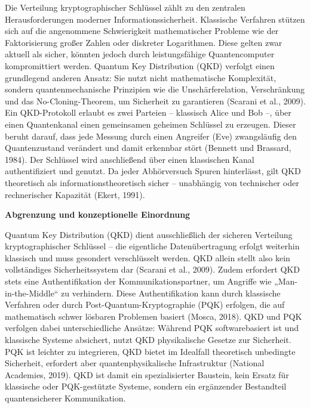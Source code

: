 \noindent
Die Verteilung kryptographischer Schlüssel zählt zu den zentralen Herausforderungen moderner Informationssicherheit. Klassische Verfahren stützen sich auf die angenommene Schwierigkeit mathematischer Probleme wie der Faktorisierung großer Zahlen oder diskreter Logarithmen. Diese gelten zwar aktuell als sicher, könnten jedoch durch leistungsfähige Quantencomputer kompromittiert werden.
Quantum Key Distribution (QKD) verfolgt einen grundlegend anderen Ansatz: Sie nutzt nicht mathematische Komplexität, sondern quantenmechanische Prinzipien wie die Unschärferelation, Verschränkung und das No-Cloning-Theorem, um Sicherheit zu garantieren (Scarani et al., 2009).
Ein QKD-Protokoll erlaubt es zwei Parteien – klassisch Alice und Bob –, über einen Quantenkanal einen gemeinsamen geheimen Schlüssel zu erzeugen. Dieser beruht darauf, dass jede Messung durch einen Angreifer (Eve) zwangsläufig den Quantenzustand verändert und damit erkennbar stört (Bennett und Brassard, 1984).
Der Schlüssel wird anschließend über einen klassischen Kanal authentifiziert und genutzt. Da jeder Abhörversuch Spuren hinterlässt, gilt QKD theoretisch als informationstheoretisch sicher – unabhängig von technischer oder rechnerischer Kapazität (Ekert, 1991).


\vspace{1em}
\noindent\textbf{Abgrenzung und konzeptionelle Einordnung}

\noindent
Quantum Key Distribution (QKD) dient ausschließlich der sicheren Verteilung kryptographischer Schlüssel – die eigentliche Datenübertragung erfolgt weiterhin klassisch und muss gesondert verschlüsselt werden. QKD allein stellt also kein vollständiges Sicherheitssystem dar (Scarani et al., 2009).
Zudem erfordert QKD stets eine Authentifikation der Kommunikationspartner, um Angriffe wie „Man-in-the-Middle“ zu verhindern. Diese Authentifikation kann durch klassische Verfahren oder durch Post-Quantum-Kryptographie (PQK) erfolgen, die auf mathematisch schwer lösbaren Problemen basiert (Mosca, 2018).
QKD und PQK verfolgen dabei unterschiedliche Ansätze: Während PQK softwarebasiert ist und klassische Systeme absichert, nutzt QKD physikalische Gesetze zur Sicherheit. PQK ist leichter zu integrieren, QKD bietet im Idealfall theoretisch unbedingte Sicherheit, erfordert aber quantenphysikalische Infrastruktur (National Academies, 2019).
QKD ist damit ein spezialisierter Baustein, kein Ersatz für klassische oder PQK-gestützte Systeme, sondern ein ergänzender Bestandteil quantensicherer Kommunikation.


